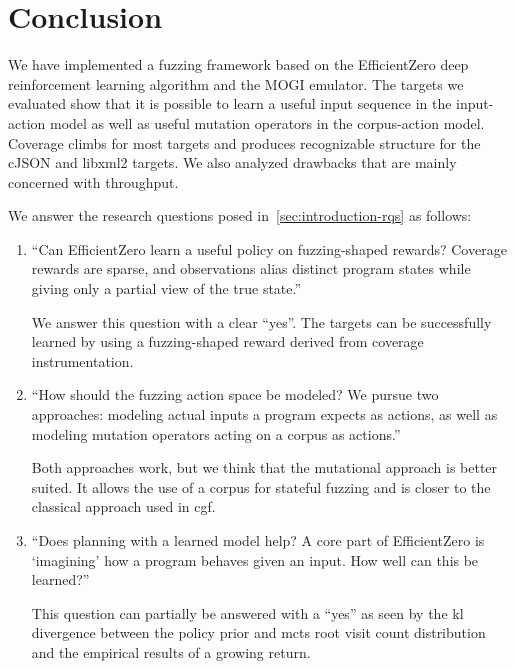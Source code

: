 
\chapter{Conclusion}\label{chap:conclusion}

We have implemented a fuzzing framework based on the EfficientZero deep reinforcement
learning algorithm and the MOGI emulator.
The targets we evaluated show that it is possible to learn a useful input sequence
in the input-action model as well as useful mutation operators in the corpus-action model.
Coverage climbs for most targets and produces recognizable structure for the cJSON
and libxml2 targets.
We also analyzed drawbacks that are mainly concerned with throughput.

We answer the research questions posed in~\cref{sec:introduction-rqs} as follows:

\begin{enumerate}[label=\textbf{RQ\arabic*.}, ref=RQ\arabic*, leftmargin=*]
  \item\label{ans:learnability}
    \enquote{Can EfficientZero learn a useful policy on fuzzing-shaped rewards?
    Coverage rewards are sparse, and observations alias distinct program states
    while giving only a partial view of the true state.}

    We answer this question with a clear \enquote{yes}.
    The targets can be successfully learned by using a fuzzing-shaped reward
    derived from coverage instrumentation.

  \item\label{ans:action-space}
    \enquote{How should the fuzzing action space be modeled?
    We pursue two approaches: modeling actual inputs a program expects as actions,
    as well as modeling mutation operators acting on a corpus as actions.}

    Both approaches work, but we think that the mutational approach is better suited.
    It allows the use of a corpus for stateful fuzzing and is closer to the classical
    approach used in \gls{cgf}.

  \item\label{ans:planning}
    \enquote{Does planning with a learned model help? A core part of EfficientZero is
    \enquote{imagining} how a program behaves given an input. How well can this be learned?}

    This question can partially be answered with a \enquote{yes} as seen by the \gls{kl} divergence
    between the policy prior and \gls{mcts} root visit count distribution and the
    empirical results of a growing return.
\end{enumerate}

